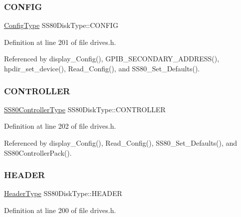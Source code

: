 \subsubsection{\texorpdfstring{C\+O\+N\+F\+IG}{CONFIG}}
{\footnotesize\ttfamily \hyperlink{structConfigType}{Config\+Type} S\+S80\+Disk\+Type\+::\+C\+O\+N\+F\+IG}



Definition at line 201 of file drives.\+h.



Referenced by display\+\_\+\+Config(), G\+P\+I\+B\+\_\+\+S\+E\+C\+O\+N\+D\+A\+R\+Y\+\_\+\+A\+D\+D\+R\+E\+S\+S(), hpdir\+\_\+set\+\_\+device(), Read\+\_\+\+Config(), and S\+S80\+\_\+\+Set\+\_\+\+Defaults().

\mbox{\label{structSS80DiskType_ae9da84cba5786cf755c388eba065c0cd}} 
\subsubsection{\texorpdfstring{C\+O\+N\+T\+R\+O\+L\+L\+ER}{CONTROLLER}}
{\footnotesize\ttfamily \hyperlink{structSS80ControllerType}{S\+S80\+Controller\+Type} S\+S80\+Disk\+Type\+::\+C\+O\+N\+T\+R\+O\+L\+L\+ER}



Definition at line 202 of file drives.\+h.



Referenced by display\+\_\+\+Config(), Read\+\_\+\+Config(), S\+S80\+\_\+\+Set\+\_\+\+Defaults(), and S\+S80\+Controller\+Pack().

\mbox{\label{structSS80DiskType_ae66c0130dee8c362743dfdfc41539c3b}} 
\subsubsection{\texorpdfstring{H\+E\+A\+D\+ER}{HEADER}}
{\footnotesize\ttfamily \hyperlink{structHeaderType}{Header\+Type} S\+S80\+Disk\+Type\+::\+H\+E\+A\+D\+ER}



Definition at line 200 of file drives.\+h.



